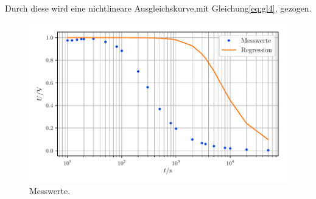 Durch diese wird eine nichtlineare Ausgleichskurve,mit Gleichung\eqref{eq:gl4}, gezogen.
\begin{figure}
    \centering
    \includegraphics{build/messung2.pdf}
    \caption{Messwerte.}
    \label{fig:plot2}
\end{figure}
